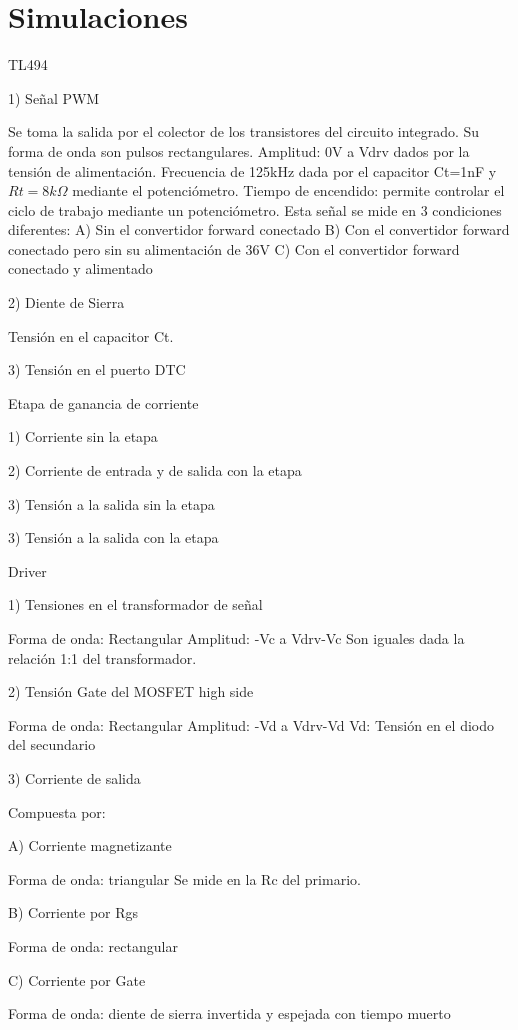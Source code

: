 \section{Simulaciones}

TL494

1) Señal PWM

Se toma la salida por el colector de los transistores del circuito integrado. 
Su forma de onda son pulsos rectangulares. 
Amplitud: 0V a Vdrv dados por la tensión de alimentación.
Frecuencia de 125kHz dada por el capacitor Ct=1nF y $Rt=8k\Omega$ mediante el potenciómetro. 
Tiempo de encendido: permite controlar el ciclo de trabajo mediante un potenciómetro. 
Esta señal se mide en 3 condiciones diferentes: 
A) Sin el convertidor forward conectado
B) Con el convertidor forward conectado pero sin su alimentación de 36V
C) Con el convertidor forward conectado y alimentado

2) Diente de Sierra 

Tensión en el capacitor Ct. 

3) Tensión en el puerto DTC 

Etapa de ganancia de corriente

1) Corriente sin la etapa

2) Corriente de entrada y de salida con la etapa 

3) Tensión a la salida sin la etapa

3) Tensión a la salida con la etapa

Driver

1) Tensiones en el transformador de señal 

Forma de onda: Rectangular 
Amplitud: -Vc a Vdrv-Vc 
Son iguales dada la relación 1:1 del transformador. 

2) Tensión Gate del MOSFET high side 

Forma de onda: Rectangular 
Amplitud: -Vd a Vdrv-Vd
Vd: Tensión en el diodo del secundario

3) Corriente de salida

Compuesta por:

A) Corriente magnetizante

Forma de onda: triangular
Se mide en la Rc del primario. 

B) Corriente por Rgs

Forma de onda: rectangular

C) Corriente por Gate

Forma de onda: diente de sierra invertida y espejada con tiempo muerto 

